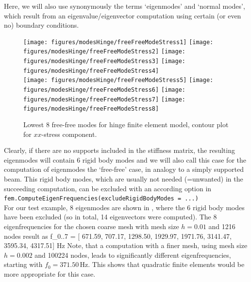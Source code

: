 Here, we will also use synonymously the terms `eigenmodes' and `normal modes', which result from an eigenvalue/eigenvector computation using certain (or even no) boundary conditions.
\begin{figure}[tbph]
  \begin{center}
  \texttt{[image: figures/modesHinge/freeFreeModeStress1]}
  \texttt{[image: figures/modesHinge/freeFreeModeStress2]}
  \texttt{[image: figures/modesHinge/freeFreeModeStress3]}
  \texttt{[image: figures/modesHinge/freeFreeModeStress4]}\\
  \texttt{[image: figures/modesHinge/freeFreeModeStress5]}
  \texttt{[image: figures/modesHinge/freeFreeModeStress6]}
  \texttt{[image: figures/modesHinge/freeFreeModeStress7]}
  \texttt{[image: figures/modesHinge/freeFreeModeStress8]}
  \end{center}
  \caption{Lowest 8 free-free modes for hinge finite element model, contour plot for $xx$-stress component.}
	\label{fig_hingePartFreeFreeModes}
\end{figure}

Clearly, if there are no supports included in the stiffness matrix, the resulting eigenmodes will contain 6 rigid body modes and we will also call this case for the computation of eigenmodes the `free-free' case, in analogy to a simply supported beam.
This rigid body modes, which are usually not needed (=unwanted) in the succeeding computation, can be excluded with an according option in \vspace{6pt}\\
\texttt{fem.ComputeEigenFrequencies(excludeRigidBodyModes = ...)}
\vspace{12pt}\\
For our test example, 8 eigenmodes are shown in , where the 6 rigid body modes have been excluded (so in total, 14 eigenvectors were computed).
The 8 eigenfrequencies for the chosen coarse mesh with mesh size $h=0.01$ and 1216 nodes result as 
\be
  f_{0..7} = [ 671.59, 707.17, 1298.50, 1929.97, 1971.76, 3141.47, 3595.34, 4317.51] Hz
\ee
Note, that a computation with a finer mesh, using mesh size $h=0.002$ and 100224 nodes, leads to significantly different eigenfrequencies, starting with $f_0=371.50\,$Hz. This shows that quadratic finite elements would be more appropriate for this case.

